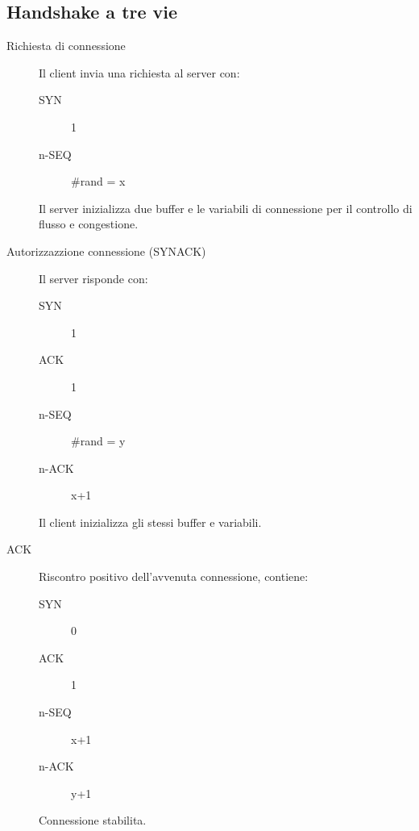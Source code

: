 \subsection{Handshake a tre vie}
\begin{description}
    \item[Richiesta di connessione] Il client invia una richiesta al server con:
    \begin{description}
        \item[SYN] 1
        \item[n-SEQ] \#rand {\tiny = x}
    \end{description}
    Il server inizializza due buffer e le variabili di connessione per il controllo di flusso e congestione.
    \item[Autorizzazzione connessione (SYNACK)] Il server risponde con:
    \begin{description}
        \item[SYN] 1
        \item[ACK] 1 
        \item[n-SEQ] \#rand {\tiny = y}
        \item[n-ACK] x+1
    \end{description}
    Il client inizializza gli stessi buffer e variabili.
    \item[ACK] Riscontro positivo dell'avvenuta connessione, contiene:
    \begin{description}
        \item[SYN] 0
        \item[ACK] 1
        \item[n-SEQ] x+1
        \item[n-ACK] y+1 
    \end{description}
    Connessione stabilita.
\end{description}
